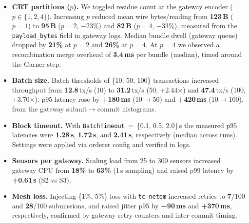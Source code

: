 \documentclass[12pt,onecolumn]{IEEEtran} %
\begin{document}
\begin{itemize}
  \item \textbf{CRT partitions ($p$).} We toggled residue count at the gateway encoder ($p\in\{1,2,4\}$). Increasing $p$ reduced mean wire bytes/reading from \textbf{123\,B} ($p{=}1$) to \textbf{95\,B} ($p{=}2$, \(-23\%\)) and \textbf{82\,B} ($p{=}4$, \(-33\%\)), measured from the \texttt{payload\_bytes} field in gateway logs. Median bundle dwell (gateway queue) dropped by \textbf{21\%} at $p{=}2$ and \textbf{26\%} at $p{=}4$. At $p{=}4$ we observed a recombination merge overhead of \textbf{3.4\,ms} per bundle (median), timed around the Garner step.
  \item \textbf{Batch size.} Batch thresholds of \{10, 50, 100\} transactions increased throughput from \textbf{12.8}\,tx/s (10) to \textbf{31.2}\,tx/s (50, +2.44$\times$) and \textbf{47.4}\,tx/s (100, +3.70$\times$). p95 latency rose by \textbf{+180\,ms} (10$\to$50) and \textbf{+420\,ms} (10$\to$100), from the gateway submit$\to$commit histograms.
  \item \textbf{Block timeout.} With \texttt{BatchTimeout}~=~\{0.1, 0.5, 2.0\}\,s the measured p95 latencies were \textbf{1.28\,s}, \textbf{1.72\,s}, and \textbf{2.41\,s}, respectively (median across runs). Settings were applied via orderer config and verified in logs.
  \item \textbf{Sensors per gateway.} Scaling load from 25 to 300 sensors increased gateway CPU from \textbf{18\%} to \textbf{63\%} (1\,s sampling) and raised p99 latency by \textbf{+0.61\,s} (S2 vs S3).
  \item \textbf{Mesh loss.} Injecting \{1\%, 5\%\} loss with \texttt{tc netem} increased retries to \textbf{7}/100 and \textbf{28}/100 submissions, and raised jitter p95 by \textbf{+90\,ms} and \textbf{+370\,ms}, respectively, confirmed by gateway retry counters and inter-commit timing.
\end{itemize}

\sweepsdata
\end{document}
